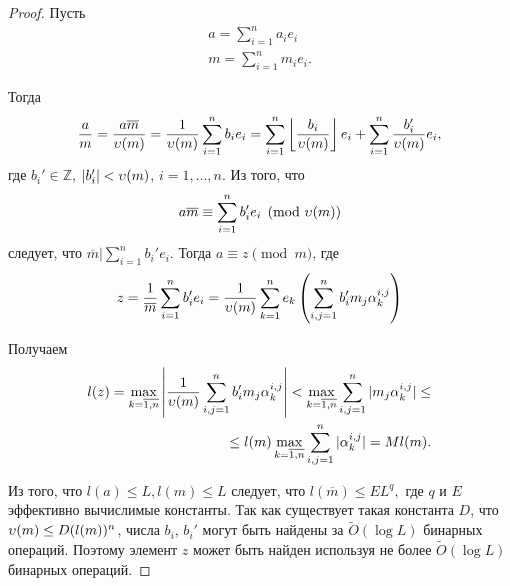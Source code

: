 \documentclass[_00_dissertation.tex]{subfiles}
\begin{document}
\begin{proof}
    Пусть
    \begin{equation*}
        \begin{split}
            a = \sum_{i=1}^n a_i e_i\\
            m = \sum_{i=1}^n m_i e_i.
        \end{split}
    \end{equation*}
    
    Тогда
    \begin{equation*}
        \frac{a}{m} = \frac{a\overline{m}}{\upsilon(m)} =
            \frac{1}{\upsilon(m)}\sum\limits_{i=1}^n b_i e_i =
            \sum\limits_{i=1}^n \left\lfloor
                \frac{b_i}{\upsilon(m)}
            \right\rfloor e_i + \sum\limits_{i=1}^n \frac{b_i'}{\upsilon(m)} e_i,
    \end{equation*}
    где $b_i' \in \mathbb{Z}$, $|b_i'| < \upsilon(m)$, $i = 1, \ldots, n$.
    Из того, что
    \begin{equation*}
        a\overline{m} \equiv \sum_{i=1}^n b_i' e_i \pmod{\upsilon(m)}
    \end{equation*}
    следует, что $\overline{m} \big| \sum_{i=1}^n b_i' e_i$.
    Тогда $a \equiv z \pmod{m}$, где
    \begin{equation*}
        z = \frac{1}{\overline{m}}\sum_{i=1}^n b_i' e_i = \frac{1}{\upsilon(m)}\sum_{k=1}^n e_k\left(
            \sum_{i, j = 1}^n b_i' m_j \alpha_k^{i, j}
        \right)
    \end{equation*}

    Получаем
    \begin{equation*}
        \begin{split}
            l(z) = \max_{k = \overline{1, n}} \left|
                \frac{1}{\upsilon(m)}\sum_{i, j = 1}^n b_i' m_j \alpha_k^{i, j}
            \right| < \max_{k = \overline{1, n}} \sum_{i, j = 1}^n |m_j \alpha_k^{i, j}| \le\\
            \le l(m) \max_{k = \overline{1, n}} \sum_{i, j = 1}^n |\alpha_k^{i, j}| = M l(m).
        \end{split}
    \end{equation*}

    Из того, что $l(a) \leq L, l(m) \leq L$ следует, что $l(\overline{m}) \le E L^q,$ где $q$ и $E$ эффективно вычислимые константы.
    Так как существует такая константа $D$, что $\upsilon(m) \le D (l(m))^n$, числа $b_i$, $b_i'$ могут быть найдены за $\tilde{O}(\log L)$ бинарных операций.
    Поэтому элемент $z$ может быть найден используя не более $\tilde{O}(\log L)$ бинарных операций.
\end{proof}
\end{document}
